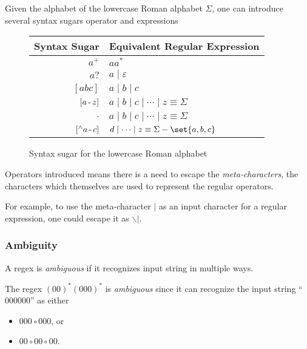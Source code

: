\begin{example}
    Given the alphabet of the lowercase Roman alphabet $\Sigma$, one can introduce several syntax sugars operator and expressions
    \begin{figure}[H]
        \centering
        \begin{tabular}{@{} r | l @{}}
            \toprule
            Syntax Sugar & Equivalent Regular Expression \\
            \midrule
            $a^+$ & $aa^\ast$  \\
            $a?$ & $a \mid \varepsilon$ \\
            $[abc]$ & $a \mid b \mid c$ \\
            $[a \operatorname{-} z]$ & 
                $a \mid b \mid c \mid \cdots \mid z \equiv \Sigma$ \\
            $.$ & 
                $a \mid b \mid c \mid \cdots \mid z \equiv \Sigma$ \\
            $[^{\wedge} a \operatorname{-} c]$ & 
                $d \mid \cdots \mid z \equiv \Sigma - \set{a, b, c}$ \\
            \bottomrule
        \end{tabular}
        \caption{Syntax sugar for the lowercase Roman alphabet}
        \label{fig:roman-syntax-sugar}
    \end{figure}
\end{example}

\begin{remark}
    Operators introduced means there is a need to escape the \textit{meta-characters}, the characters which themselves are used to represent the regular operators.
    
    For example, to use the meta-character $\mid$ as an input character for a regular expression, one could escape it as $\backslash\vert$.
\end{remark}

\subsubsection{Ambiguity}

\begin{definition}[Ambiguous]
    A regex is \textit{ambiguous} if it recognizes input string in multiple ways.
\end{definition}

\begin{example}
    The regex $(00)^\ast (000)^\ast$ is \textit{ambiguous} since it can recognize the input string \enquote{$000000$} as either
    \begin{itemize}
        \item $000 \circ 000$, or
        \item $00 \circ 00 \circ 00$.
    \end{itemize}
\end{example}

